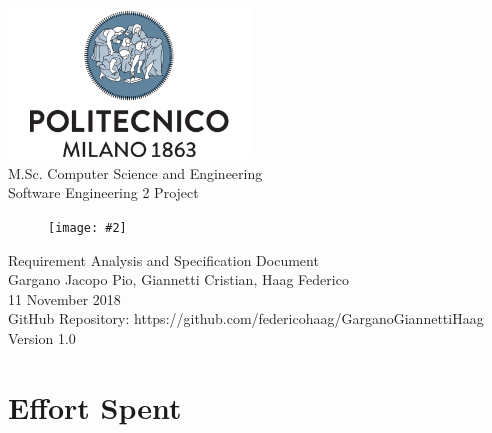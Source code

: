 \documentclass{report}
\newcommand{\image}[4]{
	\begin{figure}[H]
	\centering
	\texttt{[image: \#2]}
	\caption*{#3}
	\label{#4}

	\label{fig:nonfloat} %
	\end{figure}
}
\begin{document}
	\begin{titlepage}
		\centering	
		\vfill
		{
			\includegraphics[width =\linewidth, height = 4cm, keepaspectratio]{PolitecnicoLogo.png}
			\label{fig:PolitecnicoLogo}
			\large \\[2ex]M.Sc. Computer Science and Engineering\\
			\large Software Engineering 2 Project\\[9ex]			
			\image{5cm}{TrackMeLogo.png}{}{TrackMeLogo}
			\huge Requirement Analysis and Specification Document\\[4ex]

			\normalsize Gargano Jacopo Pio, Giannetti Cristian, Haag Federico\\[1.5ex]
			\normalsize 11 November 2018 \\[1.5ex]
			\normalsize GitHub Repository: https://github.com/federicohaag/GarganoGiannettiHaag\\[3ex]
			\normalsize Version 1.0


		}
		
	\end{titlepage}

	
	\newpage
	\tableofcontents
	\thispagestyle{fancy}
	
	\newpage
	
	
	
	
	
		
	\chapter{Effort Spent}
	\thispagestyle{fancy}
\end{document}
